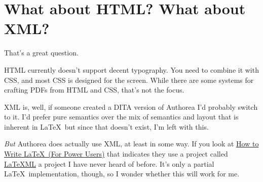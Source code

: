 \section{What about HTML?  What about XML?}
\label{sec:xml}

That's a great question.

HTML currently doesn't support decent typography.  You need to combine it with CSS, and most CSS is designed for the screen.  While there are some systems for crafting PDFs from HTML and CSS, that's not the focus.

XML is, well, if someone created a DITA version of Authorea I'd probably switch to it.  I'd prefer pure semantics over the mix of semantics and layout that is inherent in \LaTeX\ but since that doesn't exist, I'm left with this.

\emph{But} Authorea does actually use XML, at least in some way.  If you look at \href{https://www.authorea.com/users/5713/articles/28015-how-to-write-latex-for-power-users}{How to Write \LaTeX\ (For Power Users)} that indicates they use a project called \href{http://dlmf.nist.gov/LaTeXML/}{LaTeXML} a project I have never heard of before. It's only a partial \LaTeX\ implementation, though, so I wonder whether this will work for me.